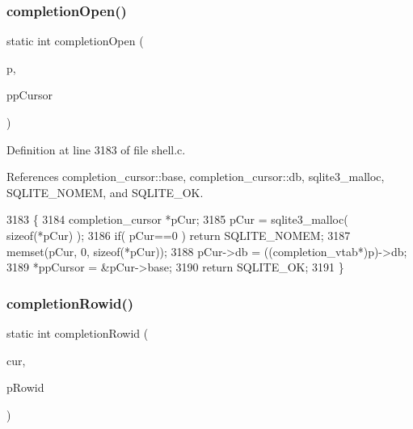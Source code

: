\mbox{\label{shell_8c_aab1b36be93be63bcdc65c3f134ee9ff5}} 
\subsubsection{completion\+Open()}
{\footnotesize\ttfamily static int completion\+Open (\begin{DoxyParamCaption}\item[{\textbf{ sqlite3\+\_\+vtab} $\ast$}]{p,  }\item[{\textbf{ sqlite3\+\_\+vtab\+\_\+cursor} $\ast$$\ast$}]{pp\+Cursor }\end{DoxyParamCaption})\hspace{0.3cm}{\ttfamily [static]}}



Definition at line 3183 of file shell.\+c.



References completion\+\_\+cursor\+::base, completion\+\_\+cursor\+::db, sqlite3\+\_\+malloc, S\+Q\+L\+I\+T\+E\+\_\+\+N\+O\+M\+EM, and S\+Q\+L\+I\+T\+E\+\_\+\+OK.


\begin{DoxyCode}
3183                                                                           \{
3184   completion_cursor *pCur;
3185   pCur = sqlite3_malloc( \textcolor{keyword}{sizeof}(*pCur) );
3186   \textcolor{keywordflow}{if}( pCur==0 ) \textcolor{keywordflow}{return} SQLITE_NOMEM;
3187   memset(pCur, 0, \textcolor{keyword}{sizeof}(*pCur));
3188   pCur->db = ((completion_vtab*)p)->db;
3189   *ppCursor = &pCur->base;
3190   \textcolor{keywordflow}{return} SQLITE_OK;
3191 \}
\end{DoxyCode}
\mbox{\label{shell_8c_a5d9717dd0e17227bc8851bcd42855695}} 
\subsubsection{completion\+Rowid()}
{\footnotesize\ttfamily static int completion\+Rowid (\begin{DoxyParamCaption}\item[{\textbf{ sqlite3\+\_\+vtab\+\_\+cursor} $\ast$}]{cur,  }\item[{\textbf{ sqlite\+\_\+int64} $\ast$}]{p\+Rowid }\end{DoxyParamCaption})\hspace{0.3cm}{\ttfamily [static]}}



